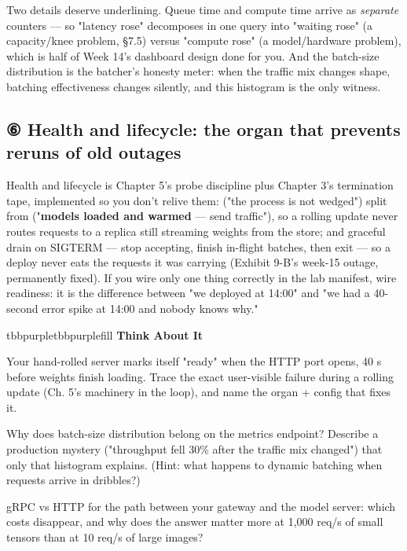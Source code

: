 Two details deserve underlining. Queue time and compute time arrive as \textit{separate} counters — so "latency rose" decomposes in one query into "waiting rose" (a capacity/knee problem, §7.5) versus "compute rose" (a model/hardware problem), which is half of Week 14's dashboard design done for you. And the batch-size distribution is the batcher's honesty meter: when the traffic mix changes shape, batching effectiveness changes silently, and this histogram is the only witness.

\subsection*{⑥ Health and lifecycle: the organ that prevents reruns of old outages}

Health and lifecycle is Chapter 5's probe discipline plus Chapter 3's termination tape, implemented so you don't relive them:  ("the process is not wedged") split from  ("\textbf{models loaded and warmed} — send traffic"), so a rolling update never routes requests to a replica still streaming weights from the store; and graceful drain on SIGTERM — stop accepting, finish in-flight batches, then exit — so a deploy never eats the requests it was carrying (Exhibit 9-B's week-15 outage, permanently fixed). If you wire only one thing correctly in the lab manifest, wire readiness: it is the difference between "we deployed at 14:00" and "we had a 40-second error spike at 14:00 and nobody knows why."

\begin{calloutbox}{tbbpurple}{tbbpurplefill}
{\normalsize\bfseries\color{tbbpurple}Think About It}\par\vspace{3pt}
\begin{tbbitemize}
  \item Your hand-rolled server marks itself "ready" when the HTTP port opens, 40 s before weights finish loading. Trace the exact user-visible failure during a rolling update (Ch. 5's machinery in the loop), and name the organ + config that fixes it.
  \item Why does batch-size distribution belong on the metrics endpoint? Describe a production mystery ("throughput fell 30\% after the traffic mix changed") that only that histogram explains. (Hint: what happens to dynamic batching when requests arrive in dribbles?)
  \item gRPC vs HTTP for the path between your gateway and the model server: which costs disappear, and why does the answer matter more at 1,000 req/s of small tensors than at 10 req/s of large images?
\end{tbbitemize}
\end{calloutbox}

